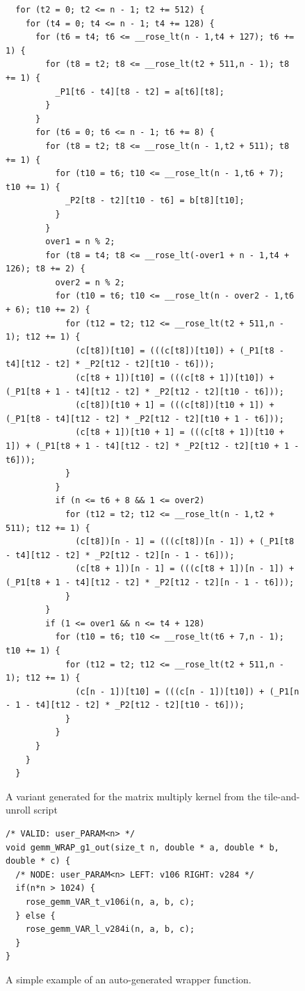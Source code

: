 \documentclass[msthesis,justified,copyright,final,numbers,sort&compress,
gsmodern,amstex,natbib]{uothesis}
\begin{document}
\begin{figure}[tbp]
\centering
\scriptsize\begin{verbatim}
  for (t2 = 0; t2 <= n - 1; t2 += 512) {
    for (t4 = 0; t4 <= n - 1; t4 += 128) {
      for (t6 = t4; t6 <= __rose_lt(n - 1,t4 + 127); t6 += 1) {
        for (t8 = t2; t8 <= __rose_lt(t2 + 511,n - 1); t8 += 1) {
          _P1[t6 - t4][t8 - t2] = a[t6][t8];
        }
      }
      for (t6 = 0; t6 <= n - 1; t6 += 8) {
        for (t8 = t2; t8 <= __rose_lt(n - 1,t2 + 511); t8 += 1) {
          for (t10 = t6; t10 <= __rose_lt(n - 1,t6 + 7); t10 += 1) {
            _P2[t8 - t2][t10 - t6] = b[t8][t10];
          }
        }
        over1 = n % 2;
        for (t8 = t4; t8 <= __rose_lt(-over1 + n - 1,t4 + 126); t8 += 2) {
          over2 = n % 2;
          for (t10 = t6; t10 <= __rose_lt(n - over2 - 1,t6 + 6); t10 += 2) {
            for (t12 = t2; t12 <= __rose_lt(t2 + 511,n - 1); t12 += 1) {
              (c[t8])[t10] = (((c[t8])[t10]) + (_P1[t8 - t4][t12 - t2] * _P2[t12 - t2][t10 - t6]));
              (c[t8 + 1])[t10] = (((c[t8 + 1])[t10]) + (_P1[t8 + 1 - t4][t12 - t2] * _P2[t12 - t2][t10 - t6]));
              (c[t8])[t10 + 1] = (((c[t8])[t10 + 1]) + (_P1[t8 - t4][t12 - t2] * _P2[t12 - t2][t10 + 1 - t6]));
              (c[t8 + 1])[t10 + 1] = (((c[t8 + 1])[t10 + 1]) + (_P1[t8 + 1 - t4][t12 - t2] * _P2[t12 - t2][t10 + 1 - t6]));
            }
          }
          if (n <= t6 + 8 && 1 <= over2) 
            for (t12 = t2; t12 <= __rose_lt(n - 1,t2 + 511); t12 += 1) {
              (c[t8])[n - 1] = (((c[t8])[n - 1]) + (_P1[t8 - t4][t12 - t2] * _P2[t12 - t2][n - 1 - t6]));
              (c[t8 + 1])[n - 1] = (((c[t8 + 1])[n - 1]) + (_P1[t8 + 1 - t4][t12 - t2] * _P2[t12 - t2][n - 1 - t6]));
            }
        }
        if (1 <= over1 && n <= t4 + 128) 
          for (t10 = t6; t10 <= __rose_lt(t6 + 7,n - 1); t10 += 1) {
            for (t12 = t2; t12 <= __rose_lt(t2 + 511,n - 1); t12 += 1) {
              (c[n - 1])[t10] = (((c[n - 1])[t10]) + (_P1[n - 1 - t4][t12 - t2] * _P2[t12 - t2][t10 - t6]));
            }
          }
      }
    }
  }
\end{verbatim}
\caption{A variant generated for the matrix multiply kernel from the tile-and-unroll script}
\label{fig:codevariant}
\end{figure}

\begin{figure}[btp]
\centering
\scriptsize\begin{verbatim}
/* VALID: user_PARAM<n> */
void gemm_WRAP_g1_out(size_t n, double * a, double * b, double * c) {
  /* NODE: user_PARAM<n> LEFT: v106 RIGHT: v284 */
  if(n*n > 1024) {
    rose_gemm_VAR_t_v106i(n, a, b, c);
  } else {
    rose_gemm_VAR_l_v284i(n, a, b, c);
  }
}
\end{verbatim}
\caption[An auto-generated wrapper function]{A simple example of an auto-generated wrapper function.}
\label{fig:wrapperfun}
\end{figure}
\end{document}
